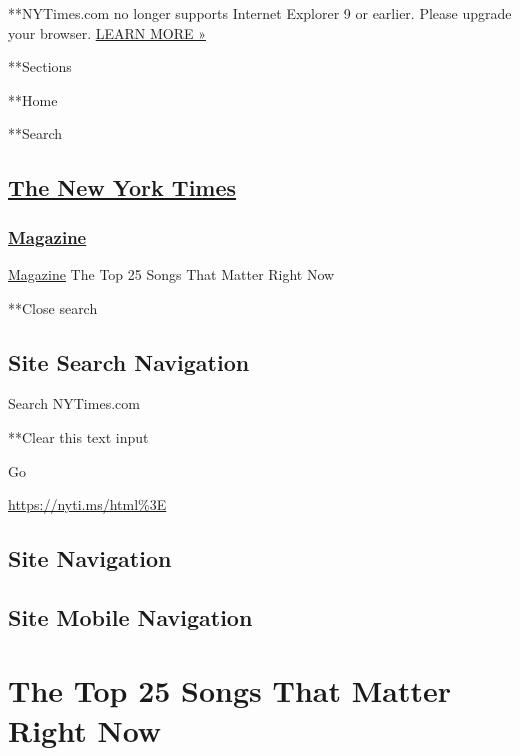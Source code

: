  **NYTimes.com no longer supports Internet Explorer 9 or earlier. Please
upgrade your browser.
\href{http://www.nytimes3xbfgragh.onion/content/help/site/ie9-support.html}{LEARN
MORE »}

**Sections

**Home

**Search

\hypertarget{the-new-york-times}{%
\subsection{\texorpdfstring{\href{http://www.nytimes3xbfgragh.onion/}{The
New York Times}}{The New York Times}}\label{the-new-york-times}}

\hypertarget{-magazine-}{%
\subsubsection{\texorpdfstring{
\href{https://www.nytimes3xbfgragh.onion/section/magazine}{Magazine}
}{ Magazine }}\label{-magazine-}}

 \href{https://www.nytimes3xbfgragh.onion/section/magazine}{Magazine}
\textbar{}The Top 25 Songs That Matter Right Now

**Close search

\hypertarget{site-search-navigation}{%
\subsection{Site Search Navigation}\label{site-search-navigation}}

Search NYTimes.com

**Clear this text input

Go

\url{https://nyti.ms/html\%3E}

\hypertarget{site-navigation}{%
\subsection{Site Navigation}\label{site-navigation}}

\hypertarget{site-mobile-navigation}{%
\subsection{Site Mobile Navigation}\label{site-mobile-navigation}}

\hypertarget{the-top-25-songs-that-matter-right-now}{%
\section{The Top 25 Songs That Matter Right
Now}\label{the-top-25-songs-that-matter-right-now}}

